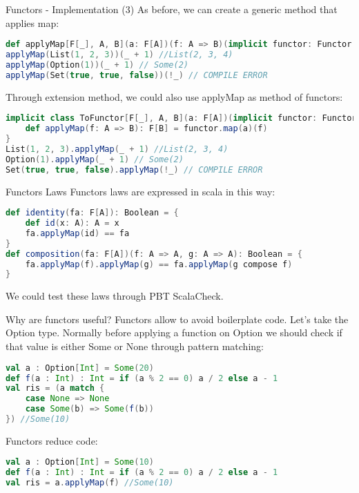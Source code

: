 \begin{frame}[fragile]{Functors - Implementation (3)}			
	As before, we can create a generic method that applies map:
\begin{lstlisting}[language=scala]
def applyMap[F[_], A, B](a: F[A])(f: A => B)(implicit functor: Functor[F]): F[B] = functor.map(a)(f)
applyMap(List(1, 2, 3))(_ + 1) //List(2, 3, 4)
applyMap(Option(1))(_ + 1) // Some(2)
applyMap(Set(true, true, false))(!_) // COMPILE ERROR
\end{lstlisting}	
	Through extension method, we could also use applyMap as method of functors:
\begin{lstlisting}[language=scala]
implicit class ToFunctor[F[_], A, B](a: F[A])(implicit functor: Functor[F]) {
	def applyMap(f: A => B): F[B] = functor.map(a)(f)
}
List(1, 2, 3).applyMap(_ + 1) //List(2, 3, 4)
Option(1).applyMap(_ + 1) // Some(2)
Set(true, true, false).applyMap(!_) // COMPILE ERROR
\end{lstlisting}	
\end{frame}

\begin{frame}[fragile]{Functors Laws}
	Functors laws are expressed in scala in this way:
\begin{lstlisting}[language=scala]
def identity(fa: F[A]): Boolean = {
	def id(x: A): A = x	
	fa.applyMap(id) == fa
}
def composition(fa: F[A])(f: A => A, g: A => A): Boolean = {
	fa.applyMap(f).applyMap(g) == fa.applyMap(g compose f)
}
\end{lstlisting}	
	We could test these laws through PBT ScalaCheck.
\end{frame}

\begin{frame}[fragile]{Why are functors useful?}
	Functors allow to avoid boilerplate code.
	Let's take the Option type. 
	Normally before applying a function on Option we should check if that value is either Some or None through pattern matching:
\begin{lstlisting}[language=scala]
val a : Option[Int] = Some(20)
def f(a : Int) : Int = if (a % 2 == 0) a / 2 else a - 1
val ris = (a match {
	case None => None
	case Some(b) => Some(f(b))
}) //Some(10)
\end{lstlisting}	
	
	Functors reduce code:
\begin{lstlisting}[language=scala]
val a : Option[Int] = Some(10)
def f(a : Int) : Int = if (a % 2 == 0) a / 2 else a - 1
val ris = a.applyMap(f) //Some(10)
\end{lstlisting}
\end{frame}